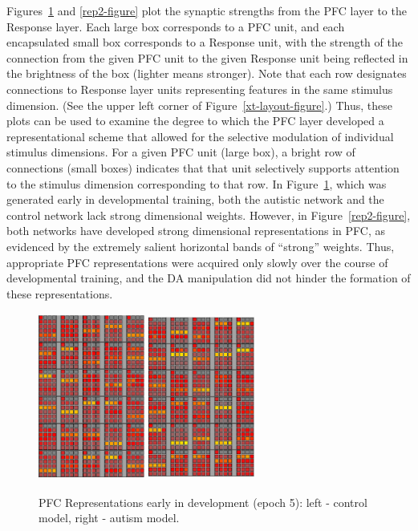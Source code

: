Figures~\ref{rep1-figure} and \ref{rep2-figure} plot the synaptic
strengths from the PFC layer to the Response layer.  Each large box
corresponds to a PFC unit, and each encapsulated small box corresponds
to a Response unit, with the strength of the connection from the given
PFC unit to the given Response unit being reflected in the brightness
of the box (lighter means stronger).  Note that each row designates
connections to Response layer units representing features in the same
stimulus dimension.  (See the upper left corner of
Figure~\ref{xt-layout-figure}.)  Thus, these plots can be used to
examine the degree to which the PFC layer developed a representational scheme that allowed for the selective modulation of individual stimulus dimensions.  For a given PFC unit (large box), a bright row of connections (small boxes) indicates that that unit selectively supports attention to the stimulus dimension corresponding to that row.  In
Figure~\ref{rep1-figure}, which was generated early in developmental
training, both the autistic network and the control network lack
strong dimensional weights.  However, in Figure~\ref{rep2-figure},
both networks have developed strong dimensional representations in
PFC, as evidenced by the extremely salient horizontal bands of
``strong'' weights.  Thus, appropriate PFC representations were
acquired only slowly over the course of developmental training, and
the DA manipulation did not hinder the formation of these
representations.

\begin{figure}[t]
\begin{center}
	\includegraphics[width=35mm,height=55mm]{graphs/PFCwts1.05.eps}
	\hspace{18 mm}
	\includegraphics[width=35mm,height=55mm]{graphs/PFCwts54.05.eps}
\end{center}
\caption{PFC Representations early in development
         (epoch 5): left - control model, right -
         autism model.}
\label{rep1-figure}
\end{figure} 

